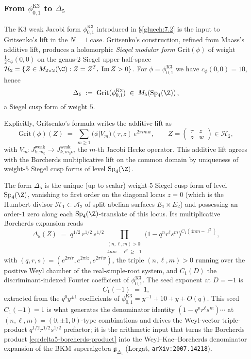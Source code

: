 \subsubsection{From $\phi_{0, 1}^{\mathrm{K3}}$ to $\Delta_5$}

The K3 weak Jacobi form $\phi_{0, 1}^{\mathrm{K3}}$ introduced in \S\ref{gluech:7.2} is the input to Gritsenko's lift in the $N = 1$ case. Gritsenko's construction, refined from Maass's additive lift, produces a holomorphic \emph{Siegel modular form} $\mathrm{Grit}(\phi)$ of weight $\tfrac12 c_\phi(0, 0)$ on the genus-$2$ Siegel upper half-space $\mathcal H_2 = \{Z \in M_{2\times 2}(\C) : Z = Z^T,\; \mathrm{Im}\, Z > 0\}$. For $\phi = \phi_{0, 1}^{\mathrm{K3}}$ we have $c_\phi(0, 0) = 10$, hence
\[
 \Delta_5 \;:=\; \mathrm{Grit}(\phi_{0, 1}^{\mathrm{K3}}) \;\in\; M_5\!\left(\mathrm{Sp}_4(\Z)\right),
\]
a Siegel cusp form of weight $5$.

Explicitly, Gritsenko's formula writes the additive lift as
\[
 \mathrm{Grit}(\phi)(Z) \;=\; \sum_{m \geq 1} \bigl(\phi\big|V_m\bigr)(\tau, z) \, e^{2\pi i m w},
 \qquad Z = \begin{pmatrix} \tau & z \\ z & w \end{pmatrix} \in \mathcal H_2,
\]
with $V_m\colon J^{\mathrm{weak}}_{k, m_0} \to J^{\mathrm{weak}}_{k, m_0 m}$ the $m$-th Jacobi Hecke operator. This additive lift agrees with the Borcherds multiplicative lift on the common domain by uniqueness of weight-$5$ Siegel cusp forms of level $\mathrm{Sp}_4(\Z)$.

The form $\Delta_5$ is the unique (up to scalar) weight-$5$ Siegel cusp form of level $\mathrm{Sp}_4(\Z)$, vanishing to first order on the diagonal locus $z = 0$ (which is the Humbert divisor $\mathcal H_1 \subset \mathcal A_2$ of split abelian surfaces $E_1 \times E_2$) and possessing an order-$1$ zero along each $\mathrm{Sp}_4(\Z)$-translate of this locus. Its multiplicative Borcherds expansion reads
\begin{equation}
 \Delta_5(Z) \;=\; q^{1/2}\, r^{1/2}\, s^{1/2} \prod_{\substack{(n, \ell, m) > 0 \\ 4nm - \ell^2 \geq -1}} \bigl(1 - q^n r^\ell s^m\bigr)^{C_1(4nm - \ell^2)},
 \label{eq:delta5-borcherds-product}
\end{equation}
with $(q, r, s) = (e^{2\pi i \tau}, e^{2\pi i z}, e^{2\pi i w})$, the triple $(n, \ell, m) > 0$ running over the positive Weyl chamber of the real-simple-root system, and $C_1(D)$ the discriminant-indexed Fourier coefficient of $\phi_{0, 1}^{\mathrm{K3}}$. The seed exponent at $D = -1$ is
\[
 C_1(-1) \;=\; 1,
\]
extracted from the \(q^0y^{\pm1}\) coefficients of
\(\phi_{0,1}^{\mathrm{K3}}=y^{-1}+10+y+O(q)\). This seed
\(C_1(-1)=1\) is what generates the denominator identity
\((1-q^nr^\ell s^m)\cdots\) at \((n,\ell,m)=(0,\pm1,0)\)-type
combinations and drives the Weyl-vector triple-product
\(q^{1/2}r^{1/2}s^{1/2}\) prefactor; it is the arithmetic input that
turns the Borcherds product \eqref{eq:delta5-borcherds-product} into the
Weyl--Kac--Borcherds denominator expansion of the BKM superalgebra
\(\mathfrak g_{\Delta_5}\) (Lorgat, \texttt{arXiv:2007.14218}).

